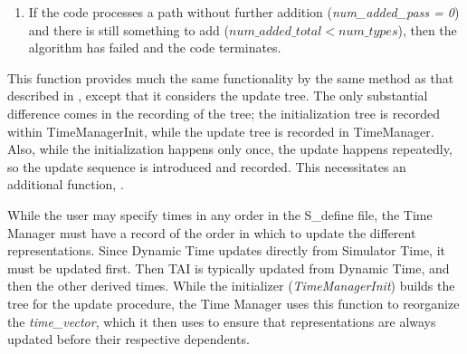 {\begin{enumerate}
{\begin{enumerate}
{\begin{enumerate}
{\begin{enumerate}
\item For each time-type that is not yet in the tree:

\begin{itemize}
\item If it has a defined time-type from which to initialize, add it to
the tree (recursively adding its parent as necessary).
\item If it does not have a defined time-type from which to initialize,
test it using status \textit{seeking\_status}
to determine whether an appropriate converter
function exists.  If it does, add the type to the tree with status
\textit{seeking\_status+1}.  If not, wait for the next pass.
\end{itemize}

\item The total number of types in the tree (\textit{num\_added\_total})
is incremented by
\textit{num\_added\_pass}, and the code loops back to step A.

\end{enumerate}}

\item If the code processes a path without further addition
(\textit{num\_added\_pass = 0}) and there is still something to add
($num\_added\_total < num\_types$), then the algorithm has failed and
the code terminates.
\end{enumerate}}

\label{ref:createupdatetree}This function provides much the same
functionality by the same method as that described in
,
except that it considers the update tree.
The only substantial difference comes in the recording of the tree; the
initialization tree is recorded within TimeManagerInit, while the
update tree is recorded in TimeManager.  Also, while the initialization
happens only once, the update happens repeatedly, so the update sequence
is introduced and recorded.  This necessitates an additional function,
.

\label{ref:setorderedupdatelist} While the user may specify times in any
order in the S\_define file, the Time Manager must have a record of the
order in which to update the different representations.  Since Dynamic
Time updates directly from Simulator Time, it must be updated first.
Then TAI is typically updated from Dynamic Time, and then the other
derived times.  While the initializer (\textit{TimeManagerInit}) builds the
tree
for the update procedure, the Time Manager uses this function to reorganize
the \textit{time\_vector}, which it then uses to ensure that
representations are always updated before their respective dependents.


\end{enumerate}}
\end{enumerate}}

